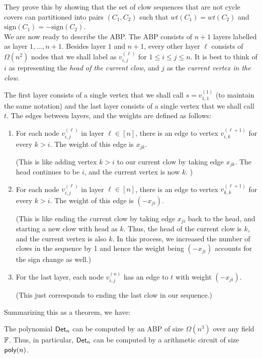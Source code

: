 They prove this by showing that the set of clow sequences that are not cycle covers can partitioned into pairs $(C_1,C_2)$ such that $wt(C_1) = wt(C_2)$ and $\mathrm{sign}(C_1) = - \mathrm{sign}(C_2)$. \\

We are now ready to describe the ABP. The ABP consists of $n+1$ layers labelled as layer $1,\dots, n+1$. Besides layer $1$ and $n+1$, every other layer $\ell$ consists of $\Omega(n^2)$ nodes that we shall label as $v_{i,j}^{(\ell)}$ for $1\leq i\leq j\leq n$. It is best to think of $i$ as representing the \emph{head of the current clow}, and $j$ as the \emph{current vertex in the clow}. 

The first layer consists of a single vertex that we shall call $s = v_{1,1}^{(1)}$ (to maintain the same notation)  and the last layer consists of a single vertex that we shall call $t$. The edges between layers, and the weights are defined as follows:

\begin{enumerate}
\item For each node $v_{i,j}^{(\ell)}$ in layer $\ell \in [n]$, there is an edge to vertex $v_{i,k}^{(\ell+1)}$ for every $k > i$. The weight of this edge is $x_{jk}$. 

(This is like adding vertex $k > i$ to our current clow by taking edge $x_{jk}$. The head continues to be $i$, and the current vertex is now $k$. )
\item For each node $v_{i,j}^{(\ell)}$ in layer $\ell \in [n]$, there is an edge to vertex $v_{k,k}^{(\ell+1)}$ for every $k > i$. The weight of this edge is $(-x_{ji})$. 

(This is like ending the current clow by taking edge $x_{ji}$ back to the head, and starting a new clow with head as $k$. Thus, the head of the current clow is $k$, and the current vertex is also $k$. In this process, we increased the number of clows in the sequence by 1 and hence the weight being $(-x_{ji})$ accounts for the sign change as well.)

\item For the last layer, each node $v_{i,j}^{(n)}$ has an edge to $t$ with weight $(-x_{ji})$. 

(This just corresponds to ending the last clow in our sequence.)
\end{enumerate}

Summarizing this as a theorem, we have:

\begin{theorem}[\cite{mv97}]\label{thm:det-abp}
The polynomial $\mathsf{Det}_n$ can be computed by an ABP of size $\Omega(n^3)$ over any field $\mathbb{F}$. Thus, in particular, $\mathsf{Det}_n$ can be computed by a arithmetic circuit of size $\mathsf{poly}(n)$. 
\end{theorem}


